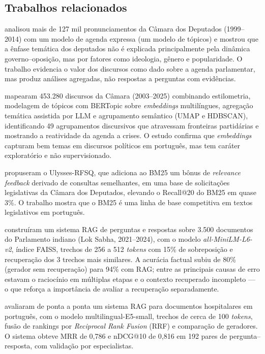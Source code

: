 \documentclass[12pt]{article}
\begin{document}
\subsection{Trabalhos relacionados}

\cite{moreira2020} analisou mais de
127 mil pronunciamentos da Câmara dos Deputados (1999--2014) com um modelo de agenda expressa (um
modelo de tópicos) e mostrou que a ênfase temática dos deputados não é explicada principalmente
pela dinâmica governo--oposição, mas por fatores como ideologia, gênero e popularidade. O
trabalho evidencia o valor dos discursos como dado sobre a agenda parlamentar, mas produz
análises agregadas, não respostas a perguntas com evidências.

\cite{soriano2026} mapearam 453.280 discursos da Câmara (2003--2025) combinando estilometria,
modelagem de tópicos com BERTopic sobre \textit{embeddings} multilíngues, agregação temática
assistida por LLM e agrupamento semântico (UMAP e HDBSCAN), identificando 49 agrupamentos
discursivos que atravessam fronteiras partidárias e mostrando a reatividade da agenda a crises. O
estudo confirma que \textit{embeddings} capturam bem temas em discursos políticos em português,
mas tem caráter exploratório e não supervisionado.

\cite{vitorio2022} propuseram o Ulysses-RFSQ, que adiciona ao BM25 um bônus de
\textit{relevance feedback} derivado de consultas semelhantes, em uma base de solicitações
legislativas da Câmara dos Deputados, elevando o Recall@20 do BM25 em quase 3\%. O trabalho mostra
que o BM25 é uma linha de base competitiva em textos legislativos em português.

\cite{sivakumar2026} construíram um sistema RAG de perguntas e respostas sobre 3.500 documentos
do Parlamento indiano (Lok Sabha, 2021--2024), com o modelo \textit{all-MiniLM-L6-v2}, índice FAISS,
trechos de 256 a 512 \textit{tokens} com 15\% de sobreposição e recuperação dos 3 trechos mais
similares. A acurácia factual subiu de 80\% (gerador sem recuperação) para 94\% com RAG; entre as
principais causas de erro estavam o raciocínio em múltiplas etapas e o contexto recuperado
incompleto --- o que reforça a importância de avaliar a recuperação separadamente.

\cite{cunha2026} avaliaram de ponta a ponta um sistema RAG para documentos hospitalares em
português, com o modelo multilingual-E5-small, trechos de cerca de 100 \textit{tokens}, fusão de
rankings por \textit{Reciprocal Rank Fusion} (RRF) e comparação de geradores. O sistema obteve MRR
de 0,786 e nDCG@10 de 0,816 em 192 pares de pergunta--resposta, com validação por especialistas.
\end{document}
